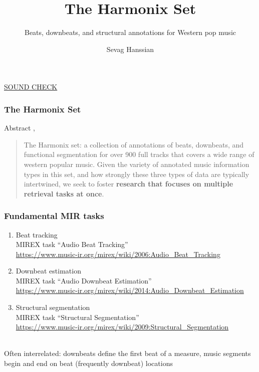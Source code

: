 \documentclass{beamer}
\title{The Harmonix Set}
\subtitle{Beats, downbeats, and structural annotations for Western pop music}
\author{Sevag Hanssian}
\institute{MUMT 621, Winter 2021}
\begin{document}
\begin{frame}
\maketitle
\href{run:./gangnam.wav}{SOUND CHECK}
\end{frame}

\begin{frame}
	\frametitle{The Harmonix Set}
	Abstract , 
	\begin{quote}
	The Harmonix set: a collection of annotations of beats, downbeats, and functional segmentation for over 900 full tracks that covers a wide range of western popular music.  Given the variety of annotated music information types in this set, and how strongly these three types of data are typically intertwined,  we seek to foster \textbf{research that focuses on multiple retrieval tasks at once}.
	\end{quote}
\end{frame}


\begin{frame}
	\frametitle{Fundamental MIR tasks}
	\begin{enumerate}
		\item
			Beat tracking\ \\
			MIREX task ``Audio Beat Tracking''\\
			\href{https://www.music-ir.org/mirex/wiki/2006:Audio_Beat_Tracking}{https://www.music-ir.org/mirex/wiki/2006:Audio\_Beat\_Tracking}
		\item
			Downbeat estimation\ \\
			MIREX task ``Audio Downbeat Estimation''\\
			\href{https://www.music-ir.org/mirex/wiki/2014:Audio_Downbeat_Estimation}{https://www.music-ir.org/mirex/wiki/2014:Audio\_Downbeat\_Estimation}
		\item
			Structural segmentation\ \\
			MIREX task ``Structural Segmentation''\\
			\href{https://www.music-ir.org/mirex/wiki/2009:Structural_Segmentation}{https://www.music-ir.org/mirex/wiki/2009:Structural\_Segmentation}
	\end{enumerate}\ \\
	\vspace{2em}
	Often interrelated: downbeats define the first beat of a measure, music segments begin and end on beat (frequently downbeat) locations
\end{frame}
\end{document}
